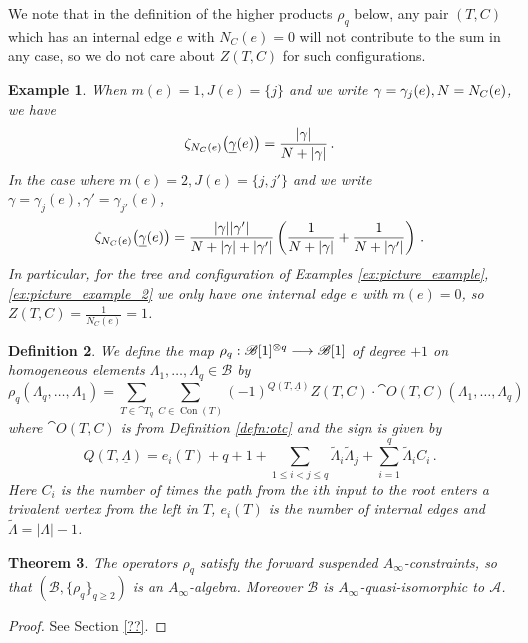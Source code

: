 \documentclass[english,letter paper,12pt,leqno]{article}
\newtheorem{theorem}{Theorem}[section]
\theoremstyle{example}
\newtheorem{definition}[theorem]{Definition}
\newtheorem{example}[theorem]{Example}
\numberwithin{equation}{section}
\begin{document}
We note that in the definition of the higher products $\rho_q$ below, any pair $(T,C)$ which has an internal edge $e$ with $N_C(e) = 0$ will not contribute to the sum in any case, so we do not care about $Z(T,C)$ for such configurations.

\begin{example} When $m(e) = 1, J(e) = \{ j \}$ and we write $\gamma = \gamma_j(e), N = N_C(e)$, we have
\[
\zeta_{N_C(e)}\big( \underline{\gamma}(e) \big) = \frac{|\gamma|}{N + |\gamma|}\,.
\]
In the case where $m(e) = 2, J(e) = \{ j, j' \}$ and we write $\gamma = \gamma_j(e), \gamma' = \gamma_{j'}(e)$,
\[
\zeta_{N_C(e)}\big( \underline{\gamma}(e) \big) = \frac{|\gamma||\gamma'|}{N + |\gamma| + |\gamma'|} \left( \frac{1}{N + |\gamma|}  + \frac{1}{N + |\gamma'|}\right)\,.
\]
In particular, for the tree and configuration of Examples \ref{ex:picture_example}, \ref{ex:picture_example_2} we only have one internal edge $e$ with $m(e) = 0$, so $Z(T,C) = \frac{1}{N_C(e)} = 1$.
\end{example}

\begin{definition}\label{defn:bainf} We define the map $\rho_q: \mathscr{B}[1]^{\otimes q} \longrightarrow \mathscr{B}[1]$ of degree $+1$ on homogeneous elements $\Lambda_1,\ldots,\Lambda_q \in \mathscr{B}$ by
\[
\rho_q( \Lambda_q, \ldots, \Lambda_1 ) = \sum_{T \in \cat{T}_q} \sum_{C \in \operatorname{Con}(T)} (-1)^{Q(T, \underline{\Lambda})} Z(T,C) \cdot \cat{O}(T, C)( \Lambda_1, \ldots, \Lambda_q )
\]
where $\cat{O}(T,C)$ is from Definition \ref{defn:otc} and the sign is given by
\[
Q(T, \underline{\Lambda}) = e_i(T) + q + 1 + \sum_{1 \le i < j \le q} \widetilde{\Lambda}_i \widetilde{\Lambda}_j + \sum_{i=1}^q \widetilde{\Lambda}_i C_i\,.
\]
Here $C_i$ is the number of times the path from the $i$th input to the root enters a trivalent vertex from the left in $T$, $e_i(T)$ is the number of internal edges and $\widetilde{\Lambda} = |\Lambda| - 1$.
\end{definition}

\begin{theorem} The operators $\rho_q$ satisfy the forward suspended $A_\infty$-constraints, so that $(\mathscr{B}, \{ \rho_q \}_{q \ge 2})$ is an $A_\infty$-algebra. Moreover $\mathscr{B}$ is $A_\infty$-quasi-isomorphic to $\mathscr{A}$.
\end{theorem}
\begin{proof}
See Section \ref{??}.
\end{proof}
\end{document}
